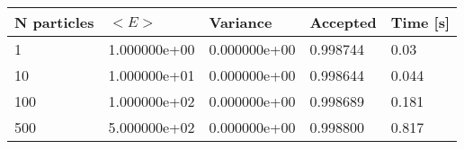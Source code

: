 \begin{table}[h!]
\begin{tabular}{|l|l|l|l|l|}
\hline 
N particles & $<E>$ & Variance & Accepted & Time [s]\\ 
 \hline 
1 & 1.000000e+00 & 0.000000e+00 & 0.998744 & 0.03 \\ \hline 
10 & 1.000000e+01 & 0.000000e+00 & 0.998644 & 0.044 \\ \hline 
100 & 1.000000e+02 & 0.000000e+00 & 0.998689 & 0.181 \\ \hline 
500 & 5.000000e+02 & 0.000000e+00 & 0.998800 & 0.817 \\ \hline 
\end{tabular}
\label{tab:ia2} 
\end{table} 
